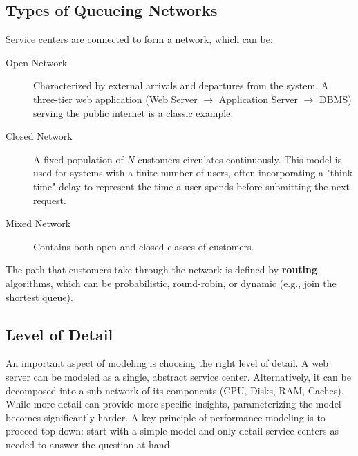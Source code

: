 \subsection{Types of Queueing Networks}
Service centers are connected to form a network, which can be:
\begin{description}
    \item[Open Network] Characterized by external arrivals and departures from the system. A three-tier web application (Web Server $\rightarrow$ Application Server $\rightarrow$ DBMS) serving the public internet is a classic example.
    \item[Closed Network] A fixed population of $N$ customers circulates continuously. This model is used for systems with a finite number of users, often incorporating a "think time" delay to represent the time a user spends before submitting the next request.
    \item[Mixed Network] Contains both open and closed classes of customers.
\end{description}
The path that customers take through the network is defined by \textbf{routing} algorithms, which can be probabilistic, round-robin, or dynamic (e.g., join the shortest queue).

\subsection{Level of Detail}
An important aspect of modeling is choosing the right level of detail. A web server can be modeled as a single, abstract service center. Alternatively, it can be decomposed into a sub-network of its components (CPU, Disks, RAM, Caches). While more detail can provide more specific insights, parameterizing the model becomes significantly harder. A key principle of performance modeling is to proceed top-down: start with a simple model and only detail service centers as needed to answer the question at hand.